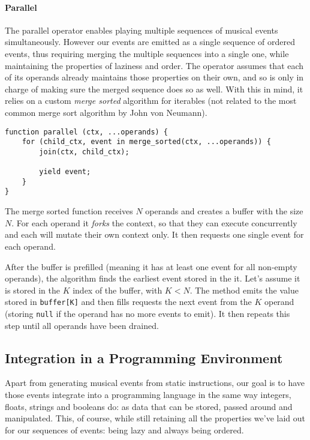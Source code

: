 \documentclass[a4paper,UKenglish,cleveref, autoref]{oasics-v2019}
\begin{document}
\paragraph*{Parallel}
The parallel operator enables playing multiple sequences of musical events simultaneously. However our events are emitted as a single sequence of ordered events, thus requiring merging the multiple sequences into a single one, while maintaining the properties of laziness and order. The operator assumes that each of its operands already maintains those properties on their own, and so is only in charge of making sure the merged sequence does so as well. With this in mind, it relies on a custom \textit{merge sorted} algorithm for iterables (not related to the most common merge sort algorithm by John von Neumann).

\begin{lstlisting}[caption={Algorithm to merge parallel musical events},label=list:8-6,captionpos=t,abovecaptionskip=-\medskipamount]
function parallel (ctx, ...operands) {
    for (child_ctx, event in merge_sorted(ctx, ...operands)) {
        join(ctx, child_ctx);
        
        yield event;
    }
}
\end{lstlisting}

The merge sorted function receives $N$ operands and creates a buffer with the size $N$. For each operand it \textit{forks} the context, so that they can execute concurrently and each will mutate their own context only. It then requests one single event for each operand.

After the buffer is prefilled (meaning it has at least one event for all non-empty operands), the algorithm finds the earliest event stored in the it. Let's assume it is stored in the $K$ index of the buffer, with $K < N$. The method emits the value stored in \texttt{buffer[K]} and then fills requests the next event from the $K$ operand (storing \texttt{null} if the operand has no more events to emit). It then repeats this step until all operands have been drained.

\subsection{Integration in a Programming Environment}
Apart from generating musical events from static instructions, our goal is to have those events integrate into a programming language in the same way integers, floats, strings and booleans do: as data that can be stored, passed around and manipulated. This, of course, while still retaining all the properties we've laid out for our sequences of events: being lazy and always being ordered.
\end{document}
